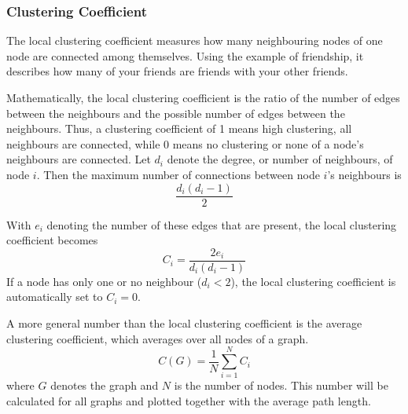 \subsubsection{Clustering Coefficient}
The local clustering coefficient measures how many neighbouring nodes of one node are connected among themselves. 
Using the example of friendship, it describes how many of your friends are friends with your other friends.

Mathematically, the local clustering coefficient is the ratio of the number of edges between the neighbours and the possible number of edges between the neighbours.
Thus, a clustering coefficient of 1 means high clustering, all neighbours are connected, while 0 means no clustering or none of a node's neighbours are connected.
Let $d_i$ denote the degree, or number of neighbours, of node $i$. Then the maximum number of connections between node $i$'s neighbours is
\begin{equation*}
	\frac{d_i(d_i-1)}{2}
\end{equation*}

With $e_i$ denoting the number of these edges that are present, the local clustering coefficient becomes 
\begin{equation*}
C_i = \frac{2e_i}{d_i(d_i-1)}
\end{equation*}
If a node has only one or no neighbour ($d_i < 2$), the local clustering coefficient is automatically set to $C_i=0$.

A more general number than the local clustering coefficient is the average clustering coefficient, which averages over all nodes of a graph. 
\begin{equation*}
C(G) = \frac{1}{N} \sum_{i=1}^{N}C_i
\end{equation*}
where $G$ denotes the graph and $N$ is the number of nodes. This number will be calculated for all graphs and plotted together with the average path length. 


